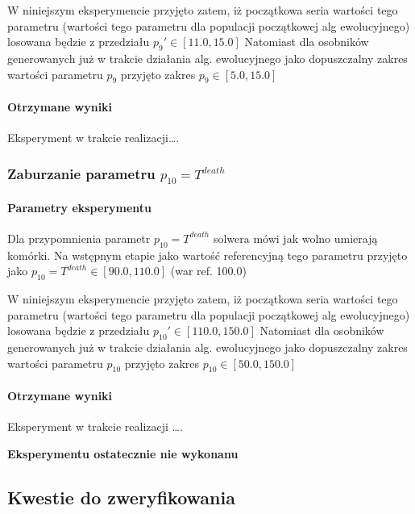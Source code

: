 \documentclass[]{article}
\let\oldparagraph\paragraph
\renewcommand{\paragraph}[1]{\oldparagraph{#1}\mbox{}}
\begin{document}
W niniejszym eksperymencie przyjęto zatem, iż początkowa seria wartości
tego parametru (wartości tego parametru dla populacji początkowej alg
ewolucyjnego) losowana będzie z przedziału \(p_9' \in [11.0,15.0]\)
Natomiast dla osobników generowanych już w trakcie działania alg.
ewolucyjnego jako dopuszczalny zakres wartości parametru \(p_9\)
przyjęto zakres \(p_9 \in [5.0,15.0]\)

\paragraph{Otrzymane wyniki}\label{otrzymane-wyniki-2}

Eksperyment w trakcie realizacji\ldots{}.

\pagebreak
\pagebreak

\subsubsection{\texorpdfstring{Zaburzanie parametru
\(p_{10}=T^{death}\)}{Zaburzanie parametru p\_\{10\}=T\^{}\{death\}}}\label{zaburzanie-parametru-pux5f10tdeath}

\paragraph{Parametry eksperymentu}\label{parametry-eksperymentu-3}

Dla przypomnienia parametr \(p_{10}=T^{death}\) solwera mówi jak wolno
umierają komórki. Na wstępnym etapie jako wartość referencyjną tego
parametru przyjęto jako \(p_{10}=T^{death} \in [90.0,110.0]\) (war ref.
100.0)

W niniejszym eksperymencie przyjęto zatem, iż początkowa seria wartości
tego parametru (wartości tego parametru dla populacji początkowej alg
ewolucyjnego) losowana będzie z przedziału \(p_{10}' \in [110.0,150.0]\)
Natomiast dla osobników generowanych już w trakcie działania alg.
ewolucyjnego jako dopuszczalny zakres wartości parametru \(p_{10}\)
przyjęto zakres \(p_{10} \in [50.0,150.0]\)

\paragraph{Otrzymane wyniki}\label{otrzymane-wyniki-3}

Eksperyment w trakcie realizacji \ldots{}.

\textbf{Eksperymentu ostatecznie nie wykonanu}

\subsection{Kwestie do zweryfikowania}\label{kwestie-do-zweryfikowania}
\end{document}
